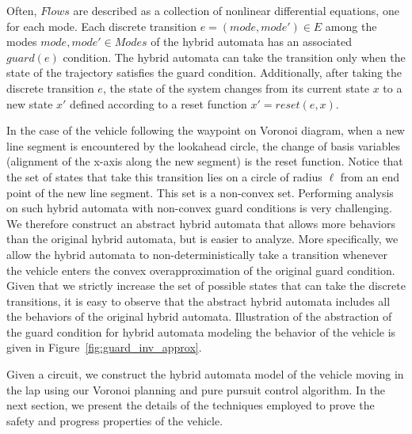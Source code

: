 Often, $Flows$ are described as a collection of nonlinear differential equations, one for each mode.
%
Each discrete transition $e = (mode, mode') \in E$ among the modes $mode, mode' \in Modes$ of the hybrid automata has an associated $guard(e)$ condition. The hybrid automata can take the transition only when the state of the trajectory satisfies the guard condition.
%
Additionally, after taking the discrete transition $e$, the state of the system changes from its current state $x$ to a new state $x'$ defined according to a reset function $x' = reset(e,x)$.
%

In the case of the vehicle following the waypoint on Voronoi diagram, when a new line segment is encountered by the lookahead circle, the change of basis variables (alignment of the x-axis along the new segment) is the reset function.
%
Notice that the set of states that take this transition lies on a circle of radius $\ell$ from an end point of the new line segment.
%
This set is a non-convex set.
%
Performing analysis on such hybrid automata with non-convex guard conditions is very challenging.
%
We therefore construct an abstract hybrid automata that allows more behaviors than the original hybrid automata, but is easier to analyze.
%
More specifically, we allow the hybrid automata to non-deterministically take a transition whenever the vehicle enters the convex overapproximation of the original guard condition.
%
Given that we strictly increase the set of possible states that can take the discrete transitions, it is easy to observe that the abstract hybrid automata includes all the behaviors of the original hybrid automata.
%
Illustration of the abstraction of the guard condition for hybrid automata modeling the behavior of the vehicle is given in Figure~\ref{fig:guard_inv_approx}.


Given a circuit, we construct the hybrid automata model of the vehicle moving in the lap using our Voronoi planning and pure pursuit control algorithm.
%
In the next section, we present the details of the techniques employed to prove the safety and progress properties of the vehicle.




